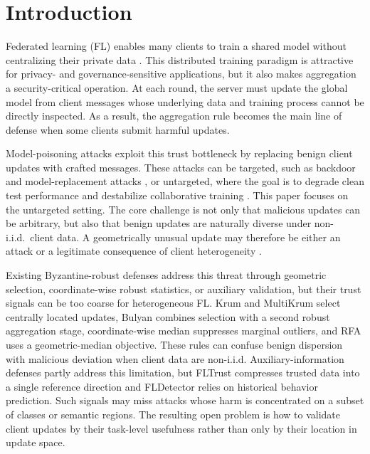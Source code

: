 \section{Introduction}
\label{sec:introduction}

Federated learning (FL) enables many clients to train a shared model without centralizing their private data \citep{mcmahan2017fedavg,bonawitz2017secureagg,kairouz2021federated}. This distributed training paradigm is attractive for privacy- and governance-sensitive applications, but it also makes aggregation a security-critical operation. At each round, the server must update the global model from client messages whose underlying data and training process cannot be directly inspected. As a result, the aggregation rule becomes the main line of defense when some clients submit harmful updates.

Model-poisoning attacks exploit this trust bottleneck by replacing benign client updates with crafted messages. These attacks can be targeted, such as backdoor and model-replacement attacks \citep{bagdasaryan2020backdoor,xie2020dba,wang2020tails}, or untargeted, where the goal is to degrade clean test performance and destabilize collaborative training \citep{baruch2019alie,fang2020local,shejwalkar2021manipulating}. This paper focuses on the untargeted setting. The core challenge is not only that malicious updates can be arbitrary, but also that benign updates are naturally diverse under non-i.i.d.\ client data. A geometrically unusual update may therefore be either an attack or a legitimate consequence of client heterogeneity \citep{zhao2018noniid,li2020fedprox,karimireddy2020scaffold,zhu2021noniidsurvey}.

Existing Byzantine-robust defenses address this threat through geometric selection, coordinate-wise robust statistics, or auxiliary validation, but their trust signals can be too coarse for heterogeneous FL. Krum and MultiKrum \citep{blanchard2017krum} select centrally located updates, Bulyan \citep{elmhamdi2018bulyan} combines selection with a second robust aggregation stage, coordinate-wise median \citep{yin2018median} suppresses marginal outliers, and RFA \citep{pillutla2022rfa} uses a geometric-median objective. These rules can confuse benign dispersion with malicious deviation when client data are non-i.i.d. Auxiliary-information defenses partly address this limitation, but FLTrust \citep{cao2021fltrust} compresses trusted data into a single reference direction and FLDetector \citep{zhang2022fldetector} relies on historical behavior prediction. Such signals may miss attacks whose harm is concentrated on a subset of classes or semantic regions. The resulting open problem is how to validate client updates by their task-level usefulness rather than only by their location in update space.

